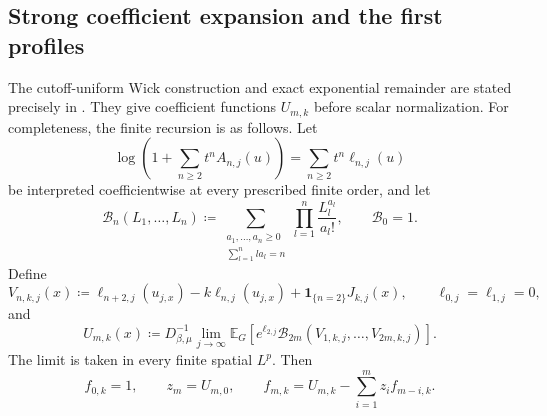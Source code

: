 \documentclass[11pt,reqno]{amsart}
\numberwithin{equation}{section}
\theoremstyle{plain}
\theoremstyle{definition}
\newcommand{\E}{\mathbb E}
\newcommand{\one}{\mathbf 1}
\newcommand{\be}{\beta}
\begin{document}
\subsection{Strong coefficient expansion and the first profiles}
\label{subsec:prescribed-coefficients}

The cutoff-uniform Wick construction and exact exponential remainder are stated precisely in .  They give coefficient functions $U_{m,k}$ before scalar normalization.  For completeness, the finite recursion is as follows.  Let
\begin{equation}
 \log\left(1+\sum_{n\geq2}t^nA_{n,j}(u)\right)
 =\sum_{n\geq2}t^n\ell_{n,j}(u)
 \label{eq:prescribed-log-coefficients}
\end{equation}
be interpreted coefficientwise at every prescribed finite order, and let
\begin{equation}
 \mathcal B_n(L_1,\ldots,L_n)
 \coloneqq
 \sum_{\substack{a_1,\ldots,a_n\geq0\\\sum_{l=1}^nla_l=n}}
 \prod_{l=1}^n\frac{L_l^{a_l}}{a_l!},
 \qquad \mathcal B_0=1.
 \label{eq:prescribed-Bell-polynomial}
\end{equation}
Define
\begin{equation}
 V_{n,k,j}(x)
 \coloneqq\ell_{n+2,j}(u_{j,x})-k\ell_{n,j}(u_{j,x})
 +\one_{\{n=2\}}J_{k,j}(x),
 \qquad \ell_{0,j}=\ell_{1,j}=0,
 \label{eq:prescribed-marked-V}
\end{equation}
and
\begin{equation}
 U_{m,k}(x)
 \coloneqq D_{\be,\mu}^{-1}
 \lim_{j\to\infty}\E_G\left[
 e^{\ell_{2,j}}\mathcal B_{2m}(V_{1,k,j},\ldots,V_{2m,k,j})
 \right].
 \label{eq:prescribed-U-coefficients}
\end{equation}
The limit is taken in every finite spatial $L^p$.  Then
\begin{equation}
 f_{0,k}=1,
 \qquad
 z_m=U_{m,0},
 \qquad
 f_{m,k}=U_{m,k}-\sum_{i=1}^mz_if_{m-i,k}.
 \label{eq:prescribed-density-recursion}
\end{equation}
\end{document}
